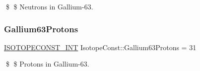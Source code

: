 \$ \$ Neutrons in Gallium-\/63. \mbox{\label{group___isotope_const-_gallium-_ga63_ga536e1bfe3d8f31dbae955ba442a33f82}} 
\subsubsection{\texorpdfstring{Gallium63\+Protons}{Gallium63Protons}}
{\footnotesize\ttfamily \mbox{\hyperlink{group___isotope_const-_macros_ga5f18360b3e99483a35c32d789e62621c}{I\+S\+O\+T\+O\+P\+E\+C\+O\+N\+S\+T\+\_\+\+I\+NT}} Isotope\+Const\+::\+Gallium63\+Protons = 31}

\$ \$ Protons in Gallium-\/63. 